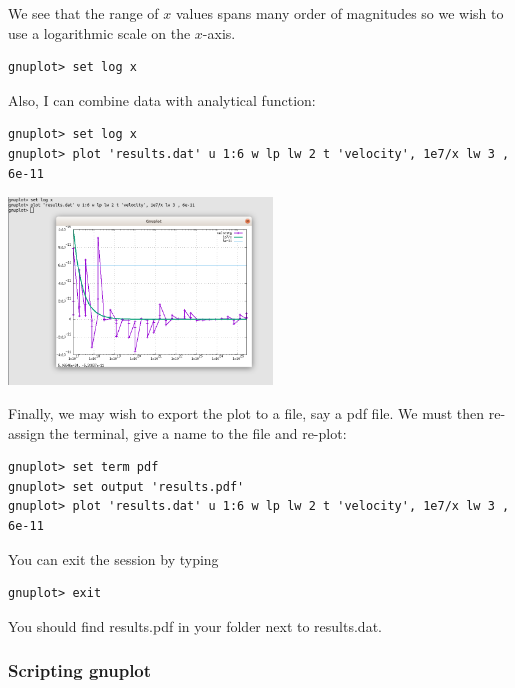 We see that the range of $x$ values spans many order of magnitudes so we wish to use 
a logarithmic scale on the $x$-axis. 
\begin{mdframed}[backgroundcolor=gray!10]
\begin{verbatim}
gnuplot> set log x
\end{verbatim}
\end{mdframed}
Also, I can combine data with analytical function:
\begin{mdframed}[backgroundcolor=gray!10]
\begin{verbatim}
gnuplot> set log x
gnuplot> plot 'results.dat' u 1:6 w lp lw 2 t 'velocity', 1e7/x lw 3 , 6e-11 
\end{verbatim}
\end{mdframed}

\begin{center}
\includegraphics[width=7cm]{images/gnuplot/gnuplot5}
\end{center}
Finally, we may wish to export the plot to a file, say a pdf file. We must then 
re-assign the terminal, give a name to the file and re-plot:
\begin{mdframed}[backgroundcolor=gray!10]
\begin{verbatim}
gnuplot> set term pdf
gnuplot> set output 'results.pdf'
gnuplot> plot 'results.dat' u 1:6 w lp lw 2 t 'velocity', 1e7/x lw 3 , 6e-11 
\end{verbatim}
\end{mdframed}
You can exit the session by typing
\begin{mdframed}[backgroundcolor=gray!10]
\begin{verbatim}
gnuplot> exit 
\end{verbatim}
\end{mdframed}
You should find {\filenamefont results.pdf} in your folder next to {\filenamefont results.dat}.

\subsubsection*{Scripting gnuplot}

